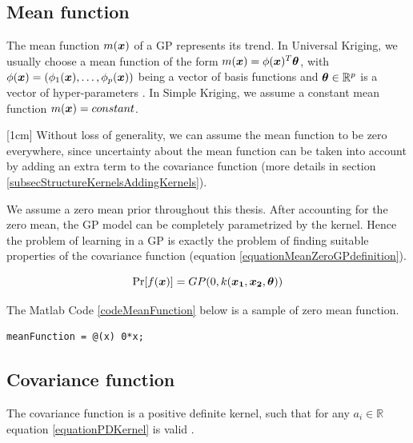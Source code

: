 \subsection{Mean function}\label{subSecCH2MeanFunction}
The mean function $m(\boldsymbol{x})$ of a GP represents its trend. In Universal Kriging, we usually choose a mean function of the form $m(\boldsymbol{x}) = \phi(\boldsymbol{x})^{T}\boldsymbol{\theta}$, with $\phi(\boldsymbol{x}) = (\phi_{1}(\boldsymbol{x}), \ldots , \phi_{p}(\boldsymbol{x}))$ being a vector of basis functions and $\boldsymbol{\theta} \in \mathbb{R}^{p}$ is a vector of hyper-parameters \cite{matheron1963principles}. In Simple Kriging, we assume a constant mean function $m(\boldsymbol{x}) = constant$.

[1cm]
Without loss of generality, we can assume the mean function to be zero everywhere, since uncertainty about the mean function can be taken into account by adding an extra term to the covariance function (more details in section \ref{subsecStructureKernelsAddingKernels}).  

We assume a zero mean prior throughout this thesis. After accounting for the zero mean, the GP model can be completely parametrized by the kernel. Hence the problem of learning in a GP is exactly the problem of finding suitable properties of the covariance function \cite{Rasmussen2005} (equation \ref{equationMeanZeroGPdefinition}). 


\begin{equation}\label{equationMeanZeroGPdefinition}
\Pr[f(\boldsymbol{x})] = GP(0 , k(\boldsymbol{x_1}, \boldsymbol{x_2}, \boldsymbol{\theta}))
\end{equation}

The Matlab Code \ref{codeMeanFunction} below is a sample of zero mean function. 

\begin{mdframed}[hidealllines=true,backgroundcolor=lightgray!20]
\begin{lstlisting}[caption={A zero mean function}, 
                    captionpos=b, 
                    label={codeMeanFunction},
                    style=Matlab-editor, 
                    basicstyle=\color{black}\ttfamily\small,
                    backgroundcolor = \color{MatlabCellColour},
                   ]
% zero mean function
meanFunction = @(x) 0*x; 

\end{lstlisting}
\end{mdframed}

\subsection{Covariance function}\label{subSecCH2Covariance}
The covariance function is a positive definite kernel, such that for any $a_{i} \in \mathbb{R}$ equation \ref{equationPDKernel} is valid \cite{Stein1999Springer}.


